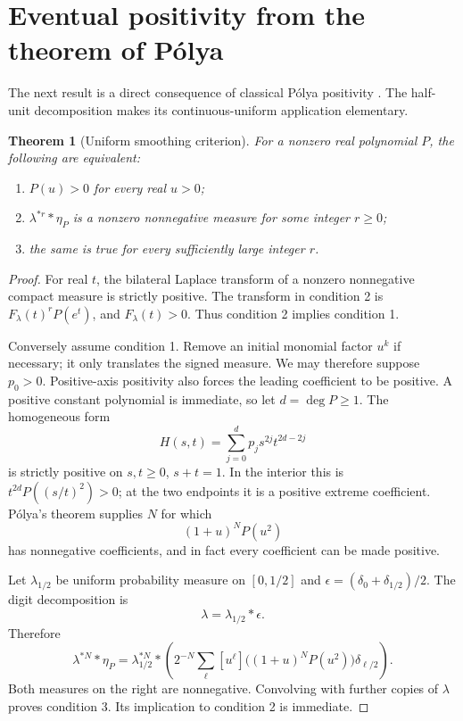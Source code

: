 \documentclass[11pt,a4paper]{article}
\newtheorem{theorem}{Theorem}[section]\newtheorem{lemma}[theorem]{Lemma}
\theoremstyle{remark}\newtheorem*{ednote}{Editorial note (ProveIt, 2026-10-01)}
\begin{document}
\section{Eventual positivity from the theorem of P\'olya}
The next result is a direct consequence of classical P\'olya positivity \cite{PowersReznick,Corners}. The half-unit decomposition makes its continuous-uniform application elementary.

\begin{theorem}[Uniform smoothing criterion]\label{thm:smoothing}
For a nonzero real polynomial $P$, the following are equivalent:
\begin{enumerate}
 \item $P(u)>0$ for every real $u>0$;
 \item $\lambda^{*r}*\eta_P$ is a nonzero nonnegative measure for some integer $r\ge0$;
 \item the same is true for every sufficiently large integer $r$.
\end{enumerate}
\end{theorem}
\begin{proof}
For real $t$, the bilateral Laplace transform of a nonzero nonnegative compact measure is strictly positive. The transform in condition 2 is $F_\lambda(t)^rP(e^t)$, and $F_\lambda(t)>0$. Thus condition 2 implies condition 1.

Conversely assume condition 1. Remove an initial monomial factor $u^k$ if necessary; it only translates the signed measure. We may therefore suppose $p_0>0$. Positive-axis positivity also forces the leading coefficient to be positive. A positive constant polynomial is immediate, so let $d=\deg P\ge1$. The homogeneous form
\[
 H(s,t)=\sum_{j=0}^dp_js^{2j}t^{2d-2j}
\]
is strictly positive on $s,t\ge0$, $s+t=1$. In the interior this is $t^{2d}P((s/t)^2)>0$; at the two endpoints it is a positive extreme coefficient. P\'olya's theorem supplies $N$ for which
\begin{equation}\label{eq:polya}
 (1+u)^NP(u^2)
\end{equation}
has nonnegative coefficients, and in fact every coefficient can be made positive.

Let $\lambda_{1/2}$ be uniform probability measure on $[0,1/2]$ and $\epsilon=(\delta_0+\delta_{1/2})/2$. The digit decomposition is
\[
 \lambda=\lambda_{1/2}*\epsilon.
\]
Therefore
\begin{equation}\label{eq:halfsplit}
 \lambda^{*N}*\eta_P
 =\lambda_{1/2}^{*N}*
 \left(2^{-N}\sum_\ell
 [u^\ell]\bigl((1+u)^NP(u^2)\bigr)\delta_{\ell/2}\right).
\end{equation}
Both measures on the right are nonnegative. Convolving with further copies of $\lambda$ proves condition 3. Its implication to condition 2 is immediate.
\end{proof}
\end{document}
